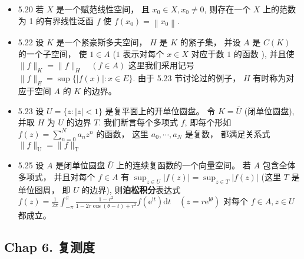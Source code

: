 \begin{itemize}
\item 5.20 若 $X$ 是一个赋范线性空间， 且 $x_{0} \in X, x_{0} \neq 0$, 则存在一个 $X$ 上的范数为 1 的有界线性泛函 $f$ 使 $f\left(x_{0}\right)=\left\|x_{0}\right\|$.

\item 5.22 设 $K$ 是一个紧豪斯多夫空间， $H$ 是 $K$ 的紧子集， 并设 $A$ 是 $C(K)$ 的一个子空间， 使 $1 \in A$ ($1$ 表示对每个 $x \in X$ 对应于数 $1$ 的函数 ), 并且使 $\|f\|_{K}=\|f\|_{H} \quad(f \in A)$ 这里我们采用记号 $\|f\|_{E}=\sup \{|f(x)|: x \in E\}$. 由于 5.23 节讨论过的例子， $H$ 有时称为对应于空间 $A$ 的 $K$ 的边界。

\item 5.23 设 $U=\{z:|z|<1\}$ 是复平面上的开单位圆盘。 令 $K=\bar{U}$ (闭单位圆盘), 并取 $H$ 为 $U$ 的边界 $T$. 我们断言每个多项式 $f$, 即每个形如 $f(z)=\sum_{n=0}^{N} a_{n} z^{n}$ 的函数， 这里 $a_{0}, \cdots, a_{N}$ 是复数， 都满足关系式 $\|f\|_{\mathrm{U}}=\|f\|_{\mathrm{T}}$

\item 5.25 设 $A$ 是闭单位圆盘 $\bar{U}$ 上的连续复函数的一个向量空间。 若 $A$ 包含全体多项式， 并且对每个 $f \in A$ 有 $\sup_{z \in U}|f(z)|=\sup _{z \in T} |f(z)|$ (这里 $T$ 是单位图周， 即 $U$ 的边界), 则\textbf{泊松积分}表达式 $f(z)=\frac{1}{2 \pi} \int_{-\pi}^{\pi} \frac{1-r^{2}}{1-2 r \cos (\theta-t)+r^{2}} f\left(\mathrm{e}^{\mathrm{i} t}\right) \mathrm{d} t \quad\left(z=r \mathrm{e}^{\mathrm{i} \theta}\right)$ 对每个 $f \in A, z \in U$ 都成立。

\end{itemize}


\subsection{Chap 6. 复测度}

